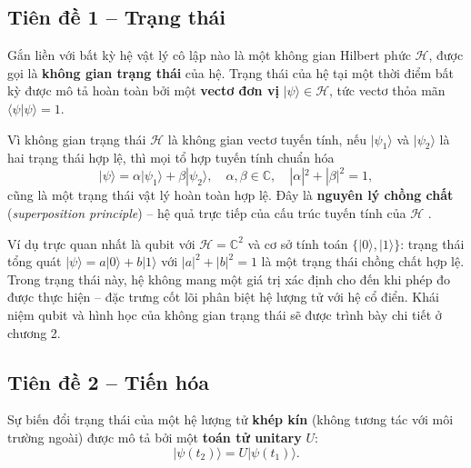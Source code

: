 \subsection*{Tiên đề 1 -- Trạng thái}

\begin{postulate}
Gắn liền với bất kỳ hệ vật lý cô lập nào là một không gian Hilbert phức $\mathcal{H}$,
được gọi là \textbf{không gian trạng thái} của hệ. Trạng thái của hệ tại một thời điểm
bất kỳ được mô tả hoàn toàn bởi một \textbf{vectơ đơn vị}
$|\psi\rangle \in \mathcal{H}$, tức vectơ thỏa mãn $\langle\psi|\psi\rangle = 1$.
\end{postulate}

\begin{remark}
Vì không gian trạng thái $\mathcal{H}$ là không gian vectơ tuyến tính, nếu
$|\psi_1\rangle$ và $|\psi_2\rangle$ là hai trạng thái hợp lệ, thì mọi tổ hợp
tuyến tính chuẩn hóa
$$|\psi\rangle = \alpha|\psi_1\rangle + \beta|\psi_2\rangle,
\quad \alpha,\beta \in \mathbb{C},\quad |\alpha|^2 + |\beta|^2 = 1,$$
cũng là một trạng thái vật lý hoàn toàn hợp lệ. Đây là \textbf{nguyên lý chồng chất}
(\textit{superposition principle}) -- hệ quả trực tiếp của cấu trúc tuyến tính của
$\mathcal{H}$ \cite{ref3}.

Ví dụ trực quan nhất là qubit với $\mathcal{H} = \mathbb{C}^2$ và cơ sở tính toán
$\{|0\rangle, |1\rangle\}$: trạng thái tổng quát $|\psi\rangle = a|0\rangle + b|1\rangle$
với $|a|^2 + |b|^2 = 1$ là một trạng thái chồng chất hợp lệ. Trong trạng thái này,
hệ không mang một giá trị xác định cho đến khi phép đo được thực hiện -- đặc trưng
cốt lõi phân biệt hệ lượng tử với hệ cổ điển. Khái niệm qubit và hình học của không
gian trạng thái sẽ được trình bày chi tiết ở chương 2.
\end{remark}

\subsection*{Tiên đề 2 -- Tiến hóa}

\begin{postulate}
Sự biến đổi trạng thái của một hệ lượng tử \textbf{khép kín} (không tương tác với
môi trường ngoài) được mô tả bởi một \textbf{toán tử unitary} $U$:
$$|\psi(t_2)\rangle = U|\psi(t_1)\rangle.$$
\end{postulate}

